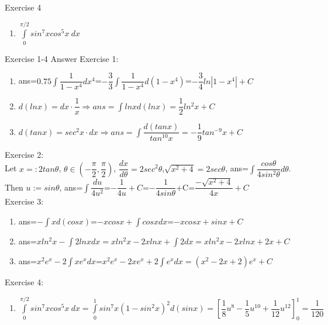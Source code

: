 \begin{frame}{Exercise 4}
    \begin{enumerate}
        \item $\int\limits_0^{\pi/2} sin^7xcos^5x\ dx$
    \end{enumerate}
\end{frame}

\begin{frame}{Exercise 1-4 Answer}
    \scriptsize
    Exercise 1:
    \begin{enumerate}
        \item ans=$0.75\int\dfrac{1}{1-x^4}dx^4$=$-\dfrac{3}{3}\int\dfrac{1}{1-x^4}d(1-x^4)$=$-\dfrac{3}{4}ln|1-x^4|+C$
        \item $d(ln x)=dx\cdot \dfrac{1}{x} \Rightarrow ans= \int lnx d(lnx)=\dfrac{1}{2}ln^2x+C$
        \item $d(tanx)=sec^2x\cdot dx\Rightarrow ans=\int \dfrac{d (tanx)}{tan^{10} x}=-\dfrac{1}{9}tan^{-9}x+C$
    \end{enumerate}
    Exercise 2:\\
    Let $x=:2tan\theta$, $\theta\in(-\dfrac{\pi}{2},\dfrac{\pi}{2})$, $\dfrac{dx}{d\theta}=2sec^2\theta$,$\sqrt{x^2+4}=2sec\theta$, ans=$\int \dfrac{cos\theta}{4sin^2\theta}d\theta$.\\
    Then $u:=sin\theta$, ans=$\int\dfrac{du}{4u^2}$=$-\dfrac{1}{4u}+C$=$-\dfrac{1}{4sin\theta}$+C=$\dfrac{-\sqrt{x^2+4}}{4x}+C$\\
    Exercise 3:
    \begin{enumerate}
        \item ans=$-\int xd(cosx)$=$-xcosx+\int cosx dx$=$-xcosx+sinx+C$
        \item ans=$xln^2x-\int 2lnxdx=xln^2x-2xlnx+\int 2dx=xln^2x-2xlnx+2x+C$
        \item ans=$x^2e^x-2\int xe^xdx$=$x^2e^x-2xe^x+2\int e^xdx=(x^2-2x+2)e^x+C$
    \end{enumerate}
    Exercise 4:
    \begin{enumerate}
        \item $\int\limits_0^{\pi/2} sin^7xcos^5x\ dx=\int\limits_0^{1} sin^7x(1-sin^2x)^2 d(sinx)=[\dfrac{1}{8}u^8-\dfrac{1}{5}u^{10}+\dfrac{1}{12}u^{12}]_{0}^{1}=\dfrac{1}{120}$
    \end{enumerate}

    \normalsize
\end{frame}

